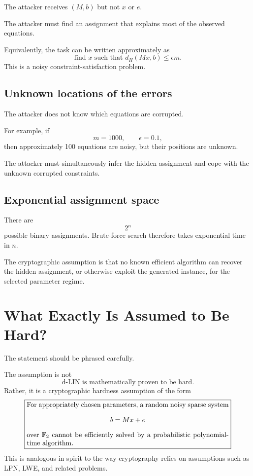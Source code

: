 \documentclass[11pt,a4paper]{article}
\newcommand{\F}{\mathbb{F}}
\begin{document}
The attacker receives $(M,b)$ but not $x$ or $e$.

The attacker must find an assignment that explains most of the
observed equations.

Equivalently, the task can be written approximately as\begin{equation}
    \boxed{
    \text{find }x\text{ such that }
    d_H(Mx,b)\leq\epsilon m.
    }
\end{equation}
This is a noisy constraint-satisfaction problem.
\subsection{Unknown locations of the errors}
The attacker does not know which equations are corrupted.

For example, if
\[
m=1000,\qquad \epsilon=0.1,
\]
then approximately 100 equations are noisy, but their positions are
unknown.

The attacker must simultaneously infer the hidden assignment and
cope with the unknown corrupted constraints.

\subsection{Exponential assignment space}
There are\begin{equation}
    2^n
\end{equation}
possible binary assignments.
Brute-force search therefore takes exponential time in $n$.

The cryptographic assumption is that no known efficient algorithm can
recover the hidden assignment, or otherwise exploit the generated
instance, for the selected parameter regime.

\section{What Exactly Is Assumed to Be Hard?}
The statement should be phrased carefully.

The assumption is not
\begin{equation}
    \text{d-LIN is mathematically proven to be hard}.
\end{equation}
Rather, it is a cryptographic hardness assumption of the form
\begin{equation}
\boxed{
\begin{minipage}{0.85\textwidth}
For appropriately chosen parameters, a random noisy sparse system
\[
b=Mx+e
\]
over $\F_2$ cannot be efficiently solved by a probabilistic
polynomial-time algorithm.
\end{minipage}}
\end{equation}
This is analogous in spirit to the way cryptography relies on
assumptions such as LPN, LWE, and related problems.
\end{document}
